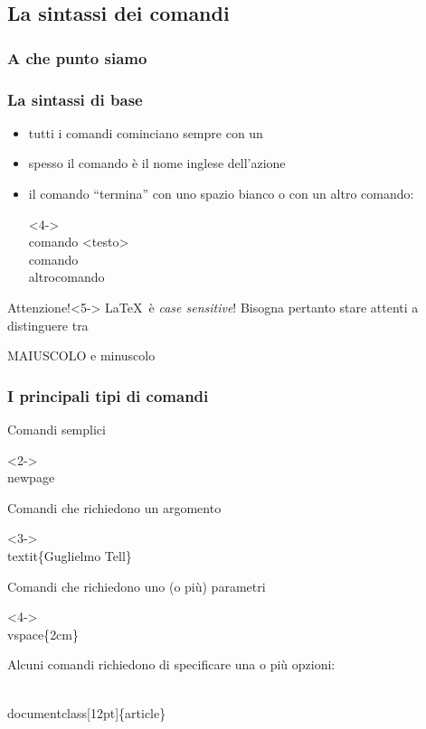 \documentclass[svgnames,%
	ucs,%
	pdftex]{guitbeamer}
\begin{document}
\subsection{La sintassi dei comandi}
\begin{frame}
  \frametitle{A che punto siamo}
\end{frame}
\begin{frame}
  \frametitle{La sintassi di base}
	\begin{itemize}[<+->]
	\item tutti i comandi cominciano sempre con un
		\LCmd\
	\item spesso il comando \`e il nome inglese dell'azione
	\item il comando ``termina'' con uno spazio bianco o con un
		altro comando:
	\begin{LaTeXcode}<4->
		\\comando \alert{<testo>}\n
		\\comando\\altrocomando
	\end{LaTeXcode}
	\end{itemize}
  \smallskip
	\begin{block}{Attenzione!}<5->
		\LaTeX\ \`e \textit{case sensitive}! Bisogna pertanto stare attenti a distinguere tra\\[.2em]
		\begin{center}
			\alert{\large MAIUSCOLO} e \alert{\large minuscolo}
		\end{center}
	\end{block}
\end{frame}
\begin{frame}
  \frametitle{I principali tipi di comandi}\small
	Comandi semplici
	\begin{LaTeXcode}<2->
		\\newpage
	\end{LaTeXcode}
  \medskip
	Comandi che richiedono un argomento
	\begin{LaTeXcode}<3->
		\\textit\{\alert{Guglielmo Tell}\}
	\end{LaTeXcode}
  \medskip
  Comandi che richiedono uno (o pi\`u) parametri
	\begin{LaTeXcode}<4->
		\\vspace\{\alert{2cm}\}
	\end{LaTeXcode}
  \bigskip
	Alcuni comandi richiedono di specificare una o pi\`u opzioni:
	\begin{LaTeXcode}
		\\documentclass[\alert{12pt}]\{article\}
	\end{LaTeXcode}
\end{frame}
\end{document}
